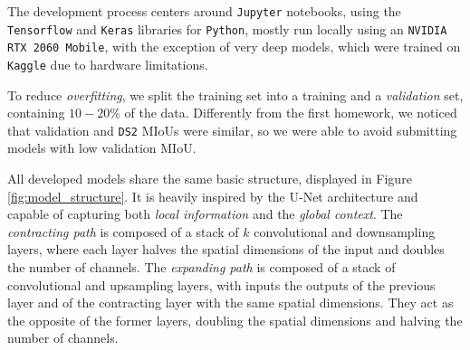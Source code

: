 \documentclass[11pt]{article}
\begin{document}
\begin{multicols}{2}


      The development process centers around \texttt{Jupyter} notebooks, using the \texttt{Tensorflow}\cite{TensorFlow} and \texttt{Keras}\cite{chollet2015keras} libraries for \texttt{Python}, mostly run locally using an \texttt{NVIDIA RTX 2060 Mobile}, with the exception of very deep models, which were trained on \texttt{Kaggle} due to hardware limitations.

      To reduce \textit{overfitting}, we split the training set into a training and a \textit{validation} set, containing $10-20\%$ of the data. Differently from the first homework, we noticed that validation and \texttt{DS2} MIoUs were similar, so we were able to avoid submitting models with low validation MIoU.

      All developed models share the same basic structure, displayed in Figure \ref{fig:model_structure}. It is heavily inspired by the U-Net\cite{ronneberger2015unetconvolutionalnetworksbiomedical} architecture and capable of capturing both \textit{local information} and the \textit{global context}. The \textit{contracting path} is composed of a stack of $k$ convolutional and downsampling layers, where each layer halves the spatial dimensions of the input and doubles the number of channels. The \textit{expanding path} is composed of a stack of convolutional and upsampling layers, with inputs the outputs of the previous layer and of the contracting layer with the same spatial dimensions. They act as the opposite of the former layers, doubling the spatial dimensions and halving the number of channels. 


\end{multicols}
\end{document}
